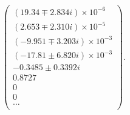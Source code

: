 \begin{equation}
\left(
\begin{array}{c}
(19.34\mp 2.834 i)\times 10^{-6}\\
(2.653\mp 2.310 i)\times 10^{-5}\\
(-9.951\mp 3.203 i)\times 10^{-3}\\
(-17.81\pm 6.820 i)\times 10^{-3}\\
-0.3485\pm 0.3392 i\\
0.8727\\
0\\
0\\
\ldots\\
\end{array}
\right).
\end{equation}

